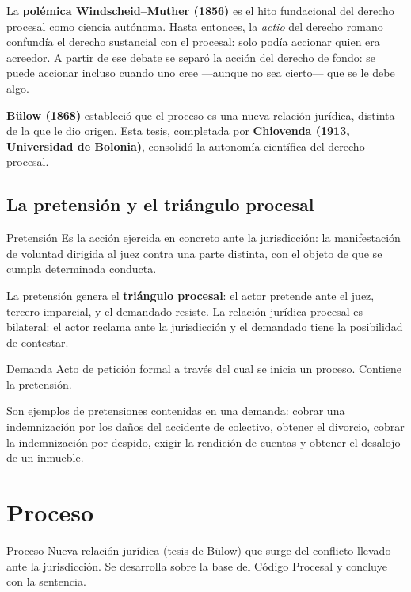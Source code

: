 \documentclass[12pt,oneside]{book}
\begin{document}
La \textbf{polémica Windscheid--Muther (1856)} es el hito fundacional del derecho procesal como ciencia autónoma. Hasta entonces, la \textit{actio} del derecho romano confundía el derecho sustancial con el procesal: solo podía accionar quien era acreedor. A partir de ese debate se separó la acción del derecho de fondo: se puede accionar incluso cuando uno cree ---aunque no sea cierto--- que se le debe algo.

\textbf{Bülow (1868)} estableció que el proceso es una nueva relación jurídica, distinta de la que le dio origen. Esta tesis, completada por \textbf{Chiovenda (1913, Universidad de Bolonia)}, consolidó la autonomía científica del derecho procesal.

\subsection{La pretensión y el triángulo procesal}

\begin{definition}{Pretensión}
Es la acción ejercida en concreto ante la jurisdicción: la manifestación de voluntad dirigida al juez contra una parte distinta, con el objeto de que se cumpla determinada conducta.
\end{definition}

La pretensión genera el \textbf{triángulo procesal}: el actor pretende ante el juez, tercero imparcial, y el demandado resiste. La relación jurídica procesal es bilateral: el actor reclama ante la jurisdicción y el demandado tiene la posibilidad de contestar.

\begin{definition}{Demanda}
Acto de petición formal a través del cual se inicia un proceso. Contiene la pretensión.
\end{definition}

Son ejemplos de pretensiones contenidas en una demanda: cobrar una indemnización por los daños del accidente de colectivo, obtener el divorcio, cobrar la indemnización por despido, exigir la rendición de cuentas y obtener el desalojo de un inmueble.

\section{Proceso}

\begin{definition}{Proceso}
Nueva relación jurídica (tesis de Bülow) que surge del conflicto llevado ante la jurisdicción. Se desarrolla sobre la base del Código Procesal y concluye con la sentencia.
\end{definition}
\end{document}
